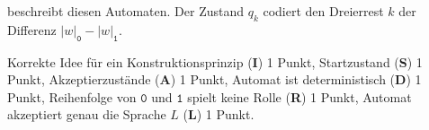\begin{loesung}
\begin{center}
\end{center}
beschreibt diesen Automaten.
Der Zustand $q_k$ codiert den Dreierrest $k$ der Differenz
$|w|_{\texttt{0}}-|w|_{\texttt{1}}$.
\end{loesung}

\begin{bewertung}
Korrekte Idee für ein Konstruktionsprinzip ({\bf I}) 1 Punkt,
Startzustand ({\bf S}) 1 Punkt,
Akzeptierzustände ({\bf A}) 1 Punkt,
Automat ist deterministisch ({\bf D}) 1 Punkt,
Reihenfolge von $\texttt{0}$ und $\texttt{1}$ spielt keine Rolle ({\bf R})
1 Punkt,
Automat akzeptiert genau die Sprache $L$ ({\bf L}) 1 Punkt.
\end{bewertung}
